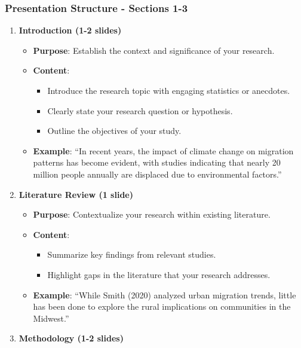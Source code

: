 \documentclass[aspectratio=169]{beamer}
\begin{document}
\begin{frame}[fragile]
    \frametitle{Presentation Structure - Sections 1-3}
    \begin{enumerate}
        \item \textbf{Introduction (1-2 slides)}
            \begin{itemize}
                \item \textbf{Purpose}: Establish the context and significance of your research.
                \item \textbf{Content}:
                    \begin{itemize}
                        \item Introduce the research topic with engaging statistics or anecdotes.
                        \item Clearly state your research question or hypothesis.
                        \item Outline the objectives of your study.
                    \end{itemize}
                \item \textbf{Example}: ``In recent years, the impact of climate change on migration patterns has become evident, with studies indicating that nearly 20 million people annually are displaced due to environmental factors.''
            \end{itemize}
        \item \textbf{Literature Review (1 slide)}
            \begin{itemize}
                \item \textbf{Purpose}: Contextualize your research within existing literature.
                \item \textbf{Content}:
                    \begin{itemize}
                        \item Summarize key findings from relevant studies.
                        \item Highlight gaps in the literature that your research addresses.
                    \end{itemize}
                \item \textbf{Example}: ``While Smith (2020) analyzed urban migration trends, little has been done to explore the rural implications on communities in the Midwest.''
            \end{itemize}
        \item \textbf{Methodology (1-2 slides)}
            \begin{itemize}

\end{itemize}
\end{enumerate}
\end{frame}
\end{document}
